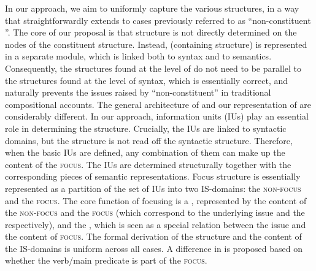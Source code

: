 \documentclass[output=paper,colorlinks,citecolor=brown]{langscibook}
\begin{document}
In our approach, we aim to uniformly capture the various  structures, in a way that straightforwardly extends to cases previously referred to as ``non-constituent ''. The core of our proposal is that  structure is not directly determined on the nodes of the constituent structure. Instead,  (containing  structure) is represented in a separate module, which is linked both to syntax and to semantics. Consequently, the structures found at the level of  do not need to be parallel to the structures found at the level of syntax, which is essentially correct, and naturally prevents the issues raised by ``non-constituent''  in traditional compositional accounts. The general architecture of  and our representation of  are considerably different. In our approach, information units (IUs) play an essential role in determining the  structure. Crucially, the IUs are linked to syntactic domains, but the  structure is not read off the syntactic structure. Therefore, when the basic IUs are defined, any combination of them can make up the content of the {\textsc{focus}}. The IUs are determined structurally together with the corresponding pieces of semantic representations. Focus structure is essentially represented as a partition of the set of IUs into two IS-domains: the {\textsc{non-focus}} and the {\textsc{focus}}. The core function of focusing is a , represented by the content of the {\textsc{non-focus}} and the {\textsc{focus}} (which correspond to the underlying issue and the  respectively), and the , which is seen as a special relation between the issue and the content of {\textsc{focus}}. The formal derivation of the  structure and the content of the IS-domains is uniform across all cases. A difference in  is proposed based on whether the verb/main predicate is part of the {\textsc{focus}}. 
\end{document}
